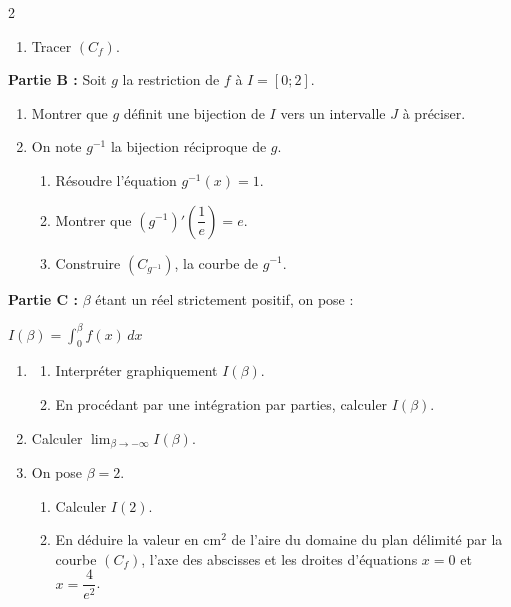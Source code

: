 \documentclass[12pt,a4paper]{article}
\begin{document}
\begin{multicols}{2}
\begin{enumerate}
\begin{enumerate}
     \( x \in ]-\infty, -1[ \cup ]-1, 0[ \).
    \item Tracer \( (C_f) \).
  \end{enumerate}
\end{enumerate}

\textbf{Partie B :}  Soit \( g \) la restriction de \( f \) à \( I = [0;2] \).
\begin{enumerate}
    \item Montrer que \( g \) définit une bijection de \( I \) vers un intervalle \( J \) à préciser.
    \item On note \( g^{-1} \) la bijection réciproque de \( g \).
    \begin{enumerate}
        \item Résoudre l’équation \( g^{-1}(x) = 1 \).
        \item Montrer que \( \left(g^{-1}\right)'\left(\dfrac{1}{e}\right) = e \).
        \item Construire \( (C_{g^{-1}}) \), la courbe de \( g^{-1} \).
    \end{enumerate}
\end{enumerate}


\textbf{Partie C :}  \( \beta \) étant un réel strictement positif, on pose :

\(I(\beta) = \int_0^{\beta} f(x)\,dx \)
\begin{enumerate}
    \item 
    \begin{enumerate}
        \item Interpréter graphiquement \( I(\beta) \).
        \item En procédant par une intégration par parties, calculer \( I(\beta) \).
    \end{enumerate}
    
    \item Calculer \( \lim_{\beta \to -\infty} I(\beta) \).
    
    \item On pose \( \beta = 2 \).
    \begin{enumerate}
        \item Calculer \( I(2) \).
        \item En déduire la valeur en \( \text{cm}^2 \) de l’aire du domaine du plan délimité par la courbe \( (C_f) \), l’axe des abscisses et les droites d’équations \( x = 0 \) et \( x = \dfrac{4}{e^2} \).
    \end{enumerate}
\end{enumerate}


\end{multicols}
\end{document}
